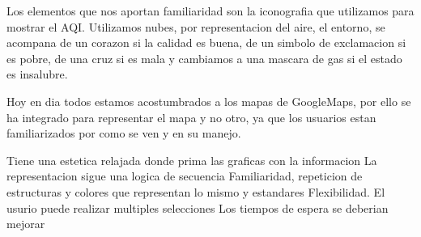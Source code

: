     Los elementos que nos aportan familiaridad son la iconografia que utilizamos para mostrar el AQI. Utilizamos nubes, por representacion
    del aire, el entorno, se acompana de un corazon si la calidad es buena, de un simbolo de exclamacion si es pobre, de una cruz si es 
    mala y cambiamos a una mascara de gas si el estado es insalubre.
    
    Hoy en dia todos estamos acostumbrados a los mapas de GoogleMaps, por ello se ha integrado para representar el mapa y no otro,
    ya que los usuarios estan familiarizados por como se ven y en su manejo.
\begin{itemize}
    \done Tiene una estetica relajada donde prima las graficas con la informacion
    \done La representacion sigue una logica de secuencia
    \done Familiaridad, repeticion de estructuras y colores que representan lo mismo y estandares
    \done Flexibilidad. El usurio puede realizar multiples selecciones
    \crossed Los tiempos de espera se deberian mejorar
\end{itemize}
\newpage